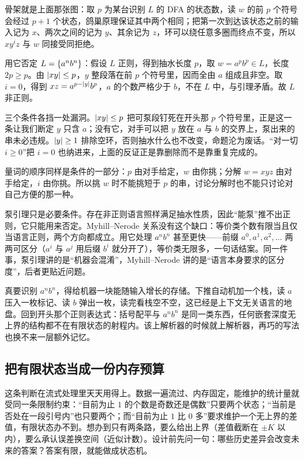 骨架就是上面那张图：取 \(p\) 为某台识别 \(L\) 的 DFA 的状态数，读 \(w\) 的前 \(p\) 个符号会经过 \(p+1\) 个状态，鸽巢原理保证其中两个相同；把第一次到达该状态之前的输入记为 \(x\)、两次之间的记为 \(y\)、其余记为 \(z\)，环可以绕任意多圈而终点不变，所以 \(xy^iz\) 与 \(w\) 同接受同拒绝。

用它否定 \(L=\left\{a^nb^n\right\}\)：假设 \(L\) 正则，得到抽水长度 \(p\)，取 \(w=a^pb^p\in L\)，长度 \(2p\ge p\)。由 \(\left|xy\right|\le p\)，\(y\) 整段落在前 \(p\) 个符号里，因而全由 \(a\) 组成且非空。取 \(i=0\)，得到 \(xz=a^{p-\left|y\right|}b^p\)，\(a\) 的个数严格少于 \(b\)，不在 \(L\) 中，与引理矛盾。故 \(L\) 非正则。

三个条件各挡一处漏洞。\(\left|xy\right|\le p\) 把可泵段钉死在开头那 \(p\) 个符号里，正是这一条让我们断定 \(y\) 只含 \(a\)；没有它，对手可以把 \(y\) 放在 \(a\) 与 \(b\) 的交界上，泵出来的串未必违规。\(\left|y\right|\ge1\) 排除空环，否则抽水什么也不改变，命题沦为废话。``对一切 \(i\ge0\)''把 \(i=0\) 也纳进来，上面的反证正是靠删除而不是靠重复完成的。

量词的顺序同样是条件的一部分：\(p\) 由对手给定，\(w\) 由你挑；分解 \(w=xyz\) 由对手给定，\(i\) 由你挑。所以挑 \(w\) 时不能挑短于 \(p\) 的串，讨论分解时也不能只讨论对自己方便的那一种。

\begin{remark}
泵引理只是必要条件。存在非正则语言照样满足抽水性质，因此``能泵''推不出正则，它只能用来否定。Myhill--Nerode 关系没有这个缺口：等价类个数有限当且仅当语言正则，两个方向都成立。用它处理 \(a^nb^n\) 甚至更快——前缀 \(a^0,a^1,a^2,\dots\) 两两可区分（\(a^i\) 与 \(a^j\) 用后缀 \(b^i\) 就分开了），等价类无限多，一句话结案。同一件事，泵引理讲的是``机器会混淆''，Myhill--Nerode 讲的是``语言本身要求的区分度''，后者更贴近问题。
\end{remark}

真要识别 \(a^nb^n\)，得给机器一块能随输入增长的存储。下推自动机加一个栈，读 \(a\) 压入一枚标记、读 \(b\) 弹出一枚，读完看栈空不空，这已经是上下文无关语言的地盘。回到开头那个正则表达式：括号配平与 \(a^nb^n\) 是同一类东西，任何嵌套深度无上界的结构都不在有限状态的射程内。该上解析器的时候就上解析器，再巧的写法也换不来一层额外记忆。

\subsection{把有限状态当成一份内存预算}

这条判断在流式处理里天天用得上。数据一遍流过、内存固定，能维护的统计量就受同一条限制约束：``目前为止 \(1\) 的个数是奇数还是偶数''只要两个状态；``当前是否处在一段引号内''也只要两个；而``目前为止 \(1\) 比 \(0\) 多''要求维护一个无上界的差值，有限状态办不到。想办到只有两条路，要么给出上界（差值截断在 \(\pm K\) 以内），要么承认误差换空间（近似计数）。设计前先问一句：哪些历史差异会改变未来的答案？答案有限，就能做成状态机。

